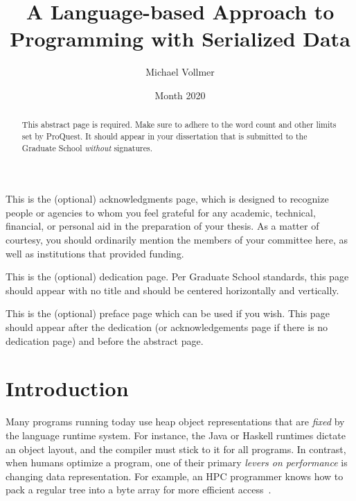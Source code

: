 \documentclass[showabstract,showacknowledgments,showpreface,showdedication]{iuphd}
\title{A Language-based Approach to Programming with Serialized Data}
\author{Michael Vollmer}
\date{Month 2020} %
\theoremstyle{nonumberplain}
\begin{document}
\maketitle
\acceptancepage




\begin{acknowledgments}
This is the (optional) acknowledgments page, which is designed to recognize people or agencies to whom you feel grateful for any academic, technical, financial, or personal aid in the preparation of your thesis. As a matter of courtesy, you should ordinarily mention the members of your committee here, as well as institutions that provided funding.
\end{acknowledgments}


\begin{dedication}
This is the (optional) dedication page. Per Graduate School standards, this page should appear with no title and should be centered horizontally and vertically.
\end{dedication}


\begin{preface}
This is the (optional) preface page which can be used if you wish. This page should appear after the dedication (or acknowledgements page if there is no dedication page) and before the abstract page.
\end{preface}


\begin{abstract}
This abstract page is required. Make sure to adhere to the word count and other limits set by ProQuest. It should appear in your dissertation that is submitted to the Graduate School \emph{without} signatures.
\end{abstract}

\newpage


\tableofcontents

\chapter{Introduction}\label{chapter:intro}

Many programs running today use heap object representations that are {\em fixed}
by the language runtime system.
For instance, the Java or Haskell runtimes dictate an object layout, and the
compiler must stick to it for all programs.
%
In contrast, when humans optimize a program, one of their primary {\em levers on
performance} is changing data representation.  For example, an HPC programmer
knows how to pack a regular tree into a byte array for more efficient
access~\cite{makino90,goldfarb13sc,Meyerovich2011}.
\end{document}

